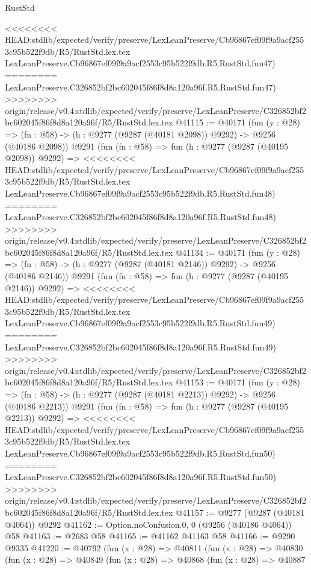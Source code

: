 \begin{lexlean}{RustStd}
\begin{coremodule}
{\begin{coremodule}
{{{{{{{{{{{{{{{{{{{{{{{{{{{{{{{{{{{{{{{{{{{{{{{{{{{{{{{<<<<<<<< HEAD:stdlib/expected/verify/preserve/LexLeanPreserve/Cb96867ef09f9a9acf2553c95b522f9db/R5/RustStd.lex.tex
    LexLeanPreserve.Cb96867ef09f9a9acf2553c95b522f9db.R5.RustStd.fun47)
========
    LexLeanPreserve.C326852bf2bc602045f86f8d8a120a96f.R5.RustStd.fun47)
>>>>>>>> origin/release/v0.4:stdlib/expected/verify/preserve/LexLeanPreserve/C326852bf2bc602045f86f8d8a120a96f/R5/RustStd.lex.tex
@41115 := @40171
    (fun (y : @28) =>
    (fn : @58) -> (h : @9277 (@9287 (@40181 @2098)) @9292) -> @9256 (@40186 @2098))
    @9291
    (fun (fn : @58) =>
    fun (h : @9277 (@9287 (@40195 @2098)) @9292) =>
<<<<<<<< HEAD:stdlib/expected/verify/preserve/LexLeanPreserve/Cb96867ef09f9a9acf2553c95b522f9db/R5/RustStd.lex.tex
    LexLeanPreserve.Cb96867ef09f9a9acf2553c95b522f9db.R5.RustStd.fun48)
========
    LexLeanPreserve.C326852bf2bc602045f86f8d8a120a96f.R5.RustStd.fun48)
>>>>>>>> origin/release/v0.4:stdlib/expected/verify/preserve/LexLeanPreserve/C326852bf2bc602045f86f8d8a120a96f/R5/RustStd.lex.tex
@41134 := @40171
    (fun (y : @28) =>
    (fn : @58) -> (h : @9277 (@9287 (@40181 @2146)) @9292) -> @9256 (@40186 @2146))
    @9291
    (fun (fn : @58) =>
    fun (h : @9277 (@9287 (@40195 @2146)) @9292) =>
<<<<<<<< HEAD:stdlib/expected/verify/preserve/LexLeanPreserve/Cb96867ef09f9a9acf2553c95b522f9db/R5/RustStd.lex.tex
    LexLeanPreserve.Cb96867ef09f9a9acf2553c95b522f9db.R5.RustStd.fun49)
========
    LexLeanPreserve.C326852bf2bc602045f86f8d8a120a96f.R5.RustStd.fun49)
>>>>>>>> origin/release/v0.4:stdlib/expected/verify/preserve/LexLeanPreserve/C326852bf2bc602045f86f8d8a120a96f/R5/RustStd.lex.tex
@41153 := @40171
    (fun (y : @28) =>
    (fn : @58) -> (h : @9277 (@9287 (@40181 @2213)) @9292) -> @9256 (@40186 @2213))
    @9291
    (fun (fn : @58) =>
    fun (h : @9277 (@9287 (@40195 @2213)) @9292) =>
<<<<<<<< HEAD:stdlib/expected/verify/preserve/LexLeanPreserve/Cb96867ef09f9a9acf2553c95b522f9db/R5/RustStd.lex.tex
    LexLeanPreserve.Cb96867ef09f9a9acf2553c95b522f9db.R5.RustStd.fun50)
========
    LexLeanPreserve.C326852bf2bc602045f86f8d8a120a96f.R5.RustStd.fun50)
>>>>>>>> origin/release/v0.4:stdlib/expected/verify/preserve/LexLeanPreserve/C326852bf2bc602045f86f8d8a120a96f/R5/RustStd.lex.tex
@41157 := @9277 (@9287 (@40181 @4064)) @9292
@41162 := Option.noConfusion.{0, 0} (@9256 (@40186 @4064)) @58
@41163 := @2683 @58
@41165 := @41162 @41163 @58
@41166 := @9290 @9335
@41220 := @40792
    (fun (x : @28) =>
    @40811
      (fun (x : @28) =>
      @40830
        (fun (x : @28) =>
        @40849
          (fun (x : @28) =>
          @40868
            (fun (x : @28) =>
            @40887
}}}}}}}}}}}}}}}}}}}}}}}}}}}}}}}}}}}}}}}}}}}}}}}}}}}}}}}
\end{coremodule}}
\end{coremodule}
\end{lexlean}
